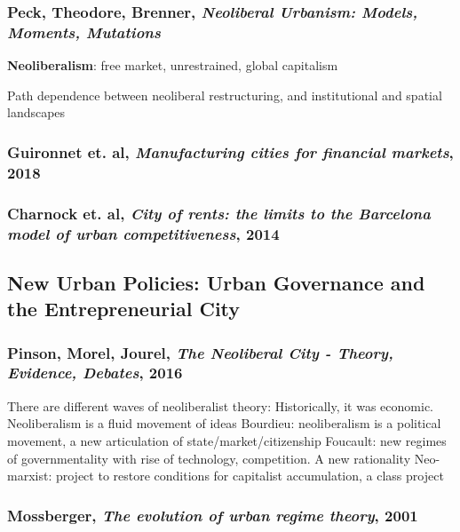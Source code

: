 \documentclass{article}
\begin{document}
\subsubsection{Peck, Theodore, Brenner, \textit{Neoliberal Urbanism: Models, Moments, Mutations}}

\textbf{Neoliberalism}: free market, unrestrained, global capitalism

\begin{outline}
	\1 Path dependence between neoliberal restructuring, and institutional and spatial landscapes
\end{outline}

\subsubsection{Guironnet et. al, \textit{Manufacturing cities for financial markets}, 2018}

\subsubsection{Charnock et. al, \textit{City of rents: the limits to the Barcelona model of urban competitiveness}, 2014}

\subsection{New Urban Policies: Urban Governance and the Entrepreneurial City}

\subsubsection{Pinson, Morel, Jourel, \textit{The Neoliberal City - Theory, Evidence, Debates}, 2016}

\begin{outline}
	\1 There are different waves of neoliberalist theory:
		\2 Historically, it was economic. Neoliberalism is a fluid movement of ideas
		\2 Bourdieu: neoliberalism is a political movement, a new articulation of state/market/citizenship
		\2 Foucault: new regimes of governmentality with rise of technology, competition. A new rationality
		\2 Neo-marxist: project to restore conditions for capitalist accumulation, a class project
\end{outline}

\subsubsection{Mossberger, \textit{The evolution of urban regime theory}, 2001}
\end{document}
